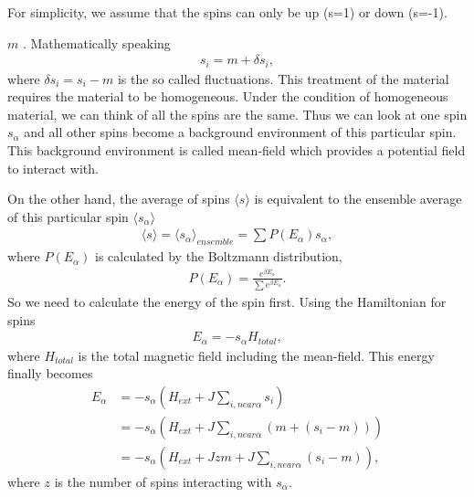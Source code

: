 \documentclass[letterpaper,10pt,english]{sphinxmanual}
\begin{document}
For simplicity, we assume that the spins can only be up (s=1) or down (s=-1).

 \(m\) . Mathematically speaking
\begin{equation*}
\begin{split}s_i = m + \delta s_i,\end{split}
\end{equation*}
where \(\delta s_i = s_i -m\) is the so called fluctuations. This treatment of the material requires the material to be homogeneous. Under the condition of homogeneous material, we can think of all the spins are the same. Thus we can look at one spin \(s_\alpha\) and all other spins become a background environment of this particular spin. This background environment is called mean-field which provides a potential field to interact with.

On the other hand, the average of spins \(\langle s \rangle\) is equivalent to the ensemble average of this particular spin \(\langle s_\alpha \rangle\)
\begin{equation*}
\begin{split}\langle  s \rangle = \langle s_\alpha \rangle_{ensemble} = \sum P(E_\alpha) s_\alpha,\end{split}
\end{equation*}
where \(P(E_\alpha)\) is calculated by the Boltzmann distribution,
\begin{equation*}
\begin{split}P(E_\alpha) = \frac{e^{\beta E_\alpha} }{  \sum e^{\beta E_\alpha} }.\end{split}
\end{equation*}
So we need to calculate the energy of the spin first. Using the Hamiltonian for spins
\begin{equation*}
\begin{split}E_\alpha = - s_\alpha H_{total},\end{split}
\end{equation*}
where \(H_{total}\) is the total magnetic field including the mean-field. This energy finally becomes
\begin{equation*}
\begin{split}E_\alpha &= - s_\alpha \left( H_{ext} + J \sum_{i, near \alpha} s_i \right) \\
&= -s_\alpha \left( H_{ext} + J \sum_{i, near \alpha} ( m + (s_i - m) ) \right) \\
& = -s_\alpha \left( H_{ext} + J z m + J \sum_{i, near \alpha} ( s_i - m ) \right),\end{split}
\end{equation*}
where \(z\) is the number of spins interacting with \(s_\alpha\).
\end{document}
